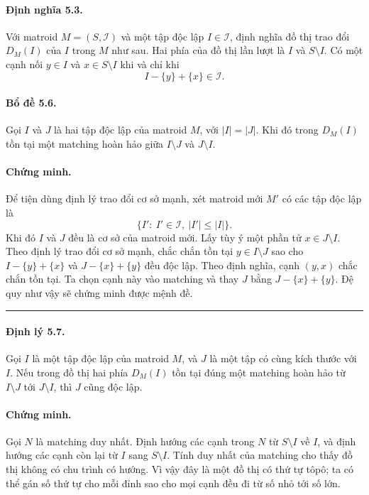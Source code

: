 \documentclass[11pt]{article}
\newcommand{\qedmark}{\hfill\rule{0.7ex}{0.7ex}}
\begin{document}
\paragraph{Định nghĩa 5.3.}
Với matroid \(M=(S,\mathcal I)\) và một tập độc lập \(I\in\mathcal I\), định
nghĩa đồ thị trao đổi \(D_M(I)\) của \(I\) trong \(M\) như sau. Hai phía của đồ
thị lần lượt là \(I\) và \(S\setminus I\). Có một cạnh nối
\(y\in I\) và \(x\in S\setminus I\) khi và chỉ khi
\[
  I-\{y\}+\{x\}\in\mathcal I.
\]

\paragraph{Bổ đề 5.6.}
Gọi \(I\) và \(J\) là hai tập độc lập của matroid \(M\), với \(|I|=|J|\). Khi đó
trong \(D_M(I)\) tồn tại một matching hoàn hảo giữa \(I\setminus J\) và
\(J\setminus I\).

\paragraph{Chứng minh.}
Để tiện dùng định lý trao đổi cơ sở mạnh, xét matroid mới \(M'\) có các tập độc
lập là
\[
  \{I':\ I'\in\mathcal I,\ |I'|\le |I|\}.
\]
Khi đó \(I\) và \(J\) đều là cơ sở của matroid mới. Lấy tùy ý một phần tử
\(x\in J\setminus I\). Theo định lý trao đổi cơ sở mạnh, chắc chắn tồn tại
\(y\in I\setminus J\) sao cho \(I-\{y\}+\{x\}\) và \(J-\{x\}+\{y\}\) đều độc
lập. Theo định nghĩa, cạnh \((y,x)\) chắc chắn tồn tại. Ta chọn cạnh này vào
matching và thay \(J\) bằng \(J-\{x\}+\{y\}\). Đệ quy như vậy sẽ chứng minh được
mệnh đề. \qedmark

\paragraph{Định lý 5.7.}
Gọi \(I\) là một tập độc lập của matroid \(M\), và \(J\) là một tập có cùng kích
thước với \(I\). Nếu trong đồ thị hai phía \(D_M(I)\) tồn tại đúng một matching
hoàn hảo từ \(I\setminus J\) tới \(J\setminus I\), thì \(J\) cũng độc lập.

\paragraph{Chứng minh.}
Gọi \(N\) là matching duy nhất. Định hướng các cạnh trong \(N\) từ
\(S\setminus I\) về \(I\), và định hướng các cạnh còn lại từ \(I\) sang
\(S\setminus I\). Tính duy nhất của matching cho thấy đồ thị không có chu trình
có hướng. Vì vậy đây là một đồ thị có thứ tự tôpô; ta có thể gán số thứ tự cho
mỗi đỉnh sao cho mọi cạnh đều đi từ số nhỏ tới số lớn.
\end{document}
